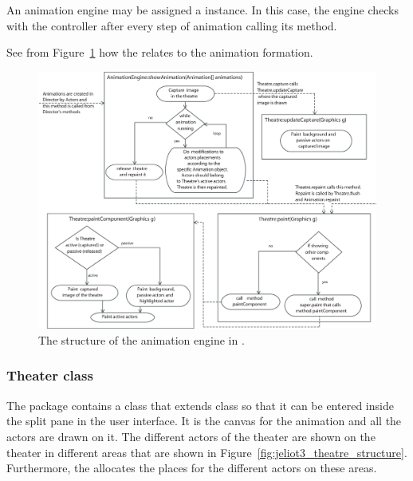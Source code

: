 An animation engine may be assigned a  instance. In this case, the engine checks with the controller after every step of animation calling its  method.

See from Figure~\ref{fig:jeliot3_animation_engine} how the  relates to the animation formation.

\begin{figure}[!htb]
\begin{center}
\includegraphics[width=\textwidth]{images/jeliot_animation_engine3.eps}
\caption{The structure of the animation engine in \jel{}.}
\label{fig:jeliot3_animation_engine}
\end{center}
\end{figure}

\subsubsection{Theater class}

The  package contains a class  that extends  class so that it can be entered inside the split pane in the user interface. It is the canvas for the animation and all the actors are drawn on it. The different actors of the theater are shown on the theater in different areas that are shown in  Figure~\ref{fig:jeliot3_theatre_structure}. Furthermore, the  allocates the places for the
different actors on these areas.

